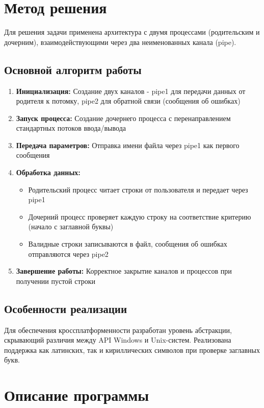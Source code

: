 \section{Метод решения}

Для решения задачи применена архитектура с двумя процессами (родительским и дочерним), взаимодействующими через два неименованных канала (pipe). 

\subsection{Основной алгоритм работы}
\begin{enumerate}
    \item \textbf{Инициализация:} Создание двух каналов - pipe1 для передачи данных от родителя к потомку, pipe2 для обратной связи (сообщения об ошибках)
    \item \textbf{Запуск процесса:} Создание дочернего процесса с перенаправлением стандартных потоков ввода/вывода
    \item \textbf{Передача параметров:} Отправка имени файла через pipe1 как первого сообщения
    \item \textbf{Обработка данных:}
    \begin{itemize}
        \item Родительский процесс читает строки от пользователя и передает через pipe1
        \item Дочерний процесс проверяет каждую строку на соответствие критерию (начало с заглавной буквы)
        \item Валидные строки записываются в файл, сообщения об ошибках отправляются через pipe2
    \end{itemize}
    \item \textbf{Завершение работы:} Корректное закрытие каналов и процессов при получении пустой строки
\end{enumerate}

\subsection{Особенности реализации}
Для обеспечения кроссплатформенности разработан уровень абстракции, скрывающий различия между API Windows и Unix-систем. Реализована поддержка как латинских, так и кириллических символов при проверке заглавных букв.

\section{Описание программы}

